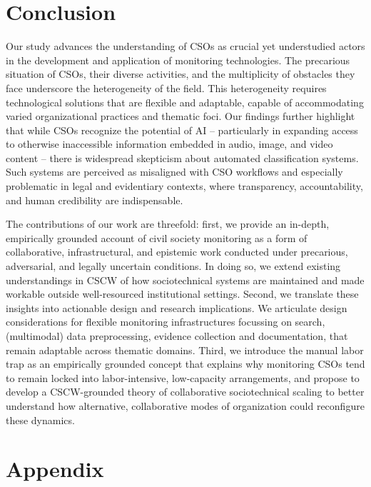 \documentclass[acmsmall]{acmart}
\begin{document}
\section{Conclusion}
Our study advances the understanding of CSOs as crucial yet understudied actors in the development and application of monitoring technologies. The precarious situation of CSOs, their diverse activities, and the multiplicity of obstacles they face underscore the heterogeneity of the field. This heterogeneity requires technological solutions that are flexible and adaptable, capable of accommodating varied organizational practices and thematic foci. Our findings further highlight that while CSOs recognize the potential of AI -- particularly in expanding access to otherwise inaccessible information embedded in audio, image, and video content -- there is widespread skepticism about automated classification systems. Such systems are perceived as misaligned with CSO workflows and especially problematic in legal and evidentiary contexts, where transparency, accountability, and human credibility are indispensable. 

The contributions of our work are threefold: first, we provide an in-depth, empirically grounded account of civil society monitoring as a form of collaborative, infrastructural, and epistemic work conducted under precarious, adversarial, and legally uncertain conditions. In doing so, we extend existing understandings in CSCW of how sociotechnical systems are maintained and made workable outside well-resourced institutional settings. 
Second, we translate these insights into actionable design and research implications. We articulate design considerations for flexible monitoring infrastructures focussing on search, (multimodal) data preprocessing, evidence collection and documentation, that remain adaptable across thematic domains. Third, we introduce the manual labor trap as an empirically grounded concept that explains why monitoring CSOs tend to remain locked into labor-intensive, low-capacity arrangements, and propose to develop a CSCW-grounded theory of collaborative sociotechnical scaling to better understand how alternative, collaborative modes of organization could reconfigure these dynamics. 






\appendix

\section{Appendix}
\end{document}
